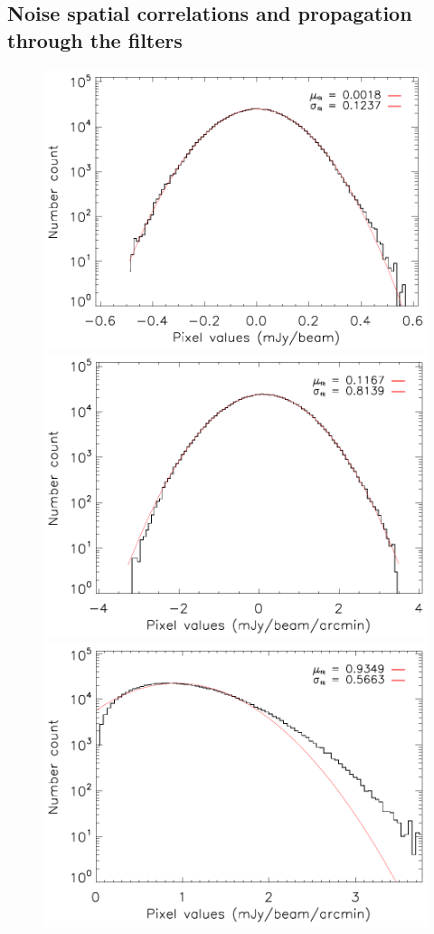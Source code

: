 \documentclass[twocolumn,traditabstract]{aa}
\begin{document}
\subsection{Noise spatial correlations and propagation through the filters}
\begin{figure}[h]
\centering
\includegraphics[trim=0cm 0cm 0cm 0cm, clip=true, totalheight=4.4cm]{Figure/DoG_noise_stat_CLJ1227.pdf}
\includegraphics[trim=0cm 0cm 0cm 0cm, clip=true, totalheight=4.4cm]{Figure/GGM_noise_stat_CLJ1227.pdf}
\includegraphics[trim=0cm 0cm 0cm 0cm, clip=true, totalheight=4.4cm]{Figure/GGM_noise_stat_CLJ1227_NoSignal.pdf}

\end{figure}
\end{document}
